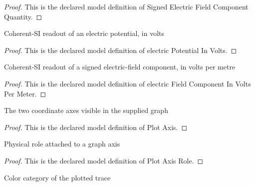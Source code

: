\begin{proof}
  This is the declared model definition of Signed Electric Field Component Quantity.
\end{proof}
\begin{definition}
  \label{def:physics:phyx-mini-0869:phyxminiproblems-problemphyxmini0869-electricpotentialinvolts}
  Coherent-SI readout of an electric potential, in volts
\end{definition}
\begin{proof}
  This is the declared model definition of electric Potential In Volts.
\end{proof}
\begin{definition}
  \label{def:physics:phyx-mini-0869:phyxminiproblems-problemphyxmini0869-electricfieldcomponentinvoltspermeter}
  Coherent-SI readout of a signed electric-field component, in volts per metre
\end{definition}
\begin{proof}
  This is the declared model definition of electric Field Component In Volts Per Meter.
\end{proof}
\begin{definition}
  \label{def:physics:phyx-mini-0869:phyxminiproblems-problemphyxmini0869-plotaxis}
  The two coordinate axes visible in the supplied graph
\end{definition}
\begin{proof}
  This is the declared model definition of Plot Axis.
\end{proof}
\begin{definition}
  \label{def:physics:phyx-mini-0869:phyxminiproblems-problemphyxmini0869-plotaxisrole}
  Physical role attached to a graph axis
\end{definition}
\begin{proof}
  This is the declared model definition of Plot Axis Role.
\end{proof}
\begin{definition}
  \label{def:physics:phyx-mini-0869:phyxminiproblems-problemphyxmini0869-tracecolor}
  Color category of the plotted trace
\end{definition}
